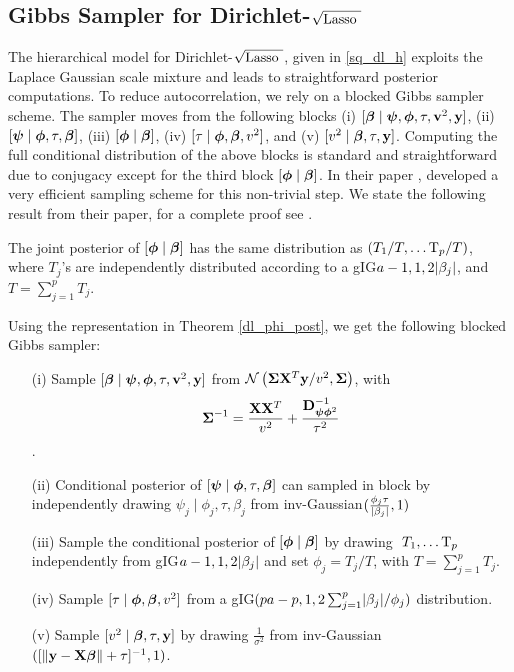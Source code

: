 \documentclass[ba]{imsart}
\def\sqdl{Dirichlet-$\sqrt{\text{\rm{Lasso} }}$}
\begin{document}
\subsection{Gibbs Sampler for \sqdl{}}\label{subsec:comp-dl}

The hierarchical model for \sqdl{}, given in \eqref{sq_dl_h} exploits the Laplace Gaussian scale mixture and leads to straightforward posterior computations. To reduce autocorrelation, we rely on a blocked Gibbs sampler scheme. The sampler moves from the following blocks \rm{(i)} $ [ \boldsymbol{\beta} \mid \boldsymbol{\psi} , \boldsymbol{\phi} , \tau , {\bf v}^2 , {\bf y} ] $, \rm{(ii)} $[\boldsymbol{\psi} \mid \boldsymbol{\phi} , \tau , \boldsymbol{\beta}]$, \rm{(iii)}   $[ \boldsymbol{\phi} \mid \boldsymbol{\beta}]$, \rm{(iv)} $[ \tau \mid \boldsymbol{\phi}, \boldsymbol{\beta}, v^2 ]$, and \rm{(v)} $[ v^2 \mid \boldsymbol{\beta} ,\tau , {\bf y} ]  $. Computing the full conditional distribution of the above blocks is standard and straightforward due to conjugacy except for the third block $[ \boldsymbol{\phi} \mid \boldsymbol{\beta}]$. In their paper \citet{bhattacharya2014dirichlet}, developed a very efficient sampling scheme for this non-trivial step. We state the following result from their paper, for a complete proof see \citep{bhattacharya2014dirichlet}.


\begin{theorem}\label{dl_phi_post}
The joint posterior of $[\boldsymbol{\phi} \mid \boldsymbol{\beta} ]$ has the same distribution as $ \left( T_1/T, \ldots {\rm T}_p/T \right)$, where $T_j$'s are independently distributed according to a \rm{gIG}$a-1 , 1 , 2\lvert\beta_j\rvert$, and $T = \sum_{j=1}^{p}T_j$. 
\end{theorem}

Using the representation in Theorem \ref{dl_phi_post}, we get the following blocked Gibbs sampler:
\begin{itemize}
\item[(i)] Sample $[ \boldsymbol{\beta} \mid \boldsymbol{\psi} , \boldsymbol{\phi} , \tau , {\bf v}^2 , {\bf y} ]$ from $\mathcal{N} \left( \boldsymbol{\Sigma} {\bf X}^T{\bf y}/v^2 , \boldsymbol{\Sigma} \right)$, with $$ \boldsymbol{\Sigma}^{-1} = \frac{{\bf X}{\bf X}^T}{v^2} + \frac{{\bf D}^{-1}_{\boldsymbol{\psi} \boldsymbol{\phi}^2}}{\tau^2} $$.

\item[(ii)]Conditional posterior of $[\boldsymbol{\psi} \mid \boldsymbol{\phi} , \tau , \boldsymbol{\beta}]$ can sampled in block  by independently drawing $ \psi_j \mid \phi_j , \tau , \beta_j $ from \rm{inv-Gaussian}$ (\frac{\phi_j\tau}{\lvert\beta_j\rvert} ,1) $

\item[(iii)] Sample the conditional posterior of $[ \boldsymbol{\phi} \mid \boldsymbol{\beta}]$ by drawing $ \ T_1, \ldots {\rm T}_p$ independently from \rm{gIG}$a-1 , 1 , 2\lvert\beta_j\rvert$ and set $\phi_j = T_j/T$, with $T = \sum_{j=1}^{p}T_j$.

\item[(iv)] Sample $[ \tau \mid \boldsymbol{\phi}, \boldsymbol{\beta}, v^2 ]$ from a \rm{gIG}$( pa-p , 1 , 2\sum^{p}_{j=1}\lvert\beta_j\rvert/\phi_j )$ distribution.

\item[(v)] Sample $[ v^2 \mid \boldsymbol{\beta} ,\tau , {\bf y} ]  $ by drawing $ \frac{1}{\sigma^2} $ from \rm{inv-Gaussian}$ ( [ \lVert{\bf y} - {\bf X}\boldsymbol{\beta}\rVert + \tau ]^{-1} ,1) $.
\end{itemize}
\end{document}

